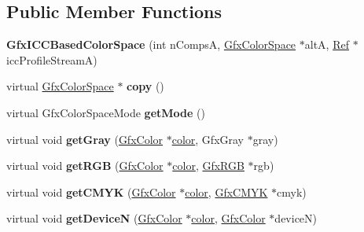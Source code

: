 \subsection*{Public Member Functions}
\begin{DoxyCompactItemize}
\item 
\mbox{\label{class_gfx_i_c_c_based_color_space_ab53fec0c6c97949a363c9ad96c6a4f66}} 
{\bfseries Gfx\+I\+C\+C\+Based\+Color\+Space} (int n\+CompsA, \hyperlink{class_gfx_color_space}{Gfx\+Color\+Space} $\ast$altA, \hyperlink{struct_ref}{Ref} $\ast$icc\+Profile\+StreamA)
\item 
\mbox{\label{class_gfx_i_c_c_based_color_space_af987e873e4e794c80d18cf4c5854fdf7}} 
virtual \hyperlink{class_gfx_color_space}{Gfx\+Color\+Space} $\ast$ {\bfseries copy} ()
\item 
\mbox{\label{class_gfx_i_c_c_based_color_space_abb18423155bf1a79e3cc1d27e1115b40}} 
virtual Gfx\+Color\+Space\+Mode {\bfseries get\+Mode} ()
\item 
\mbox{\label{class_gfx_i_c_c_based_color_space_ae2a27d2dc8209db8add9504b69f1a581}} 
virtual void {\bfseries get\+Gray} (\hyperlink{struct_gfx_color}{Gfx\+Color} $\ast$\hyperlink{structcolor}{color}, Gfx\+Gray $\ast$gray)
\item 
\mbox{\label{class_gfx_i_c_c_based_color_space_ad1c13e401dab2bd903efaa0f21633fa0}} 
virtual void {\bfseries get\+R\+GB} (\hyperlink{struct_gfx_color}{Gfx\+Color} $\ast$\hyperlink{structcolor}{color}, \hyperlink{struct_gfx_r_g_b}{Gfx\+R\+GB} $\ast$rgb)
\item 
\mbox{\label{class_gfx_i_c_c_based_color_space_a0178171845cb335ff175449a3e7de9e4}} 
virtual void {\bfseries get\+C\+M\+YK} (\hyperlink{struct_gfx_color}{Gfx\+Color} $\ast$\hyperlink{structcolor}{color}, \hyperlink{struct_gfx_c_m_y_k}{Gfx\+C\+M\+YK} $\ast$cmyk)
\item 
\mbox{\label{class_gfx_i_c_c_based_color_space_a2ea4cd4c2d62ebdb70e5c812cf1e3aff}} 
virtual void {\bfseries get\+DeviceN} (\hyperlink{struct_gfx_color}{Gfx\+Color} $\ast$\hyperlink{structcolor}{color}, \hyperlink{struct_gfx_color}{Gfx\+Color} $\ast$deviceN)

\end{DoxyCompactItemize}
